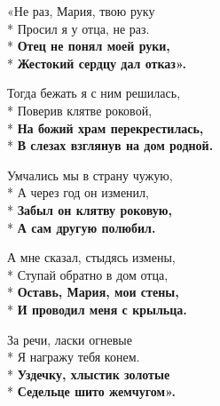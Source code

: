\medskip

\begin{minipage}{\linewidth}
«Не раз, Мария, твою руку\\*
Просил я у отца, не раз.\\*
\textbf{Отец не понял моей руки,}\\*
\textbf{Жестокий сердцу дал отказ».}\\
\end{minipage}\par\medskip\nobreak

\medskip

\begin{minipage}{\linewidth}
Тогда бежать я с ним решилась,\\*
Поверив клятве роковой,\\*
\textbf{На божий храм перекрестилась,}\\*
\textbf{В слезах взглянув на дом родной.}\\
\end{minipage}\par\medskip\nobreak

\medskip

\begin{minipage}{\linewidth}
Умчались мы в страну чужую,\\*
А через год он изменил,\\*
\textbf{Забыл он клятву роковую,}\\*
\textbf{А сам другую полюбил.}\\
\end{minipage}\par\medskip\nobreak

\medskip

\begin{minipage}{\linewidth}
А мне сказал, стыдясь измены,\\*
Ступай обратно в дом отца,\\*
\textbf{Оставь, Мария, мои стены,}\\*
\textbf{И проводил меня с крыльца.}\\
\end{minipage}\par\medskip\nobreak

\medskip

\begin{minipage}{\linewidth}
За речи, ласки огневые\\*
Я награжу тебя конем.\\*
\textbf{Уздечку, хлыстик золотые}\\*
\textbf{Седельце шито жемчугом».}\\
\end{minipage}\par\medskip\nobreak


